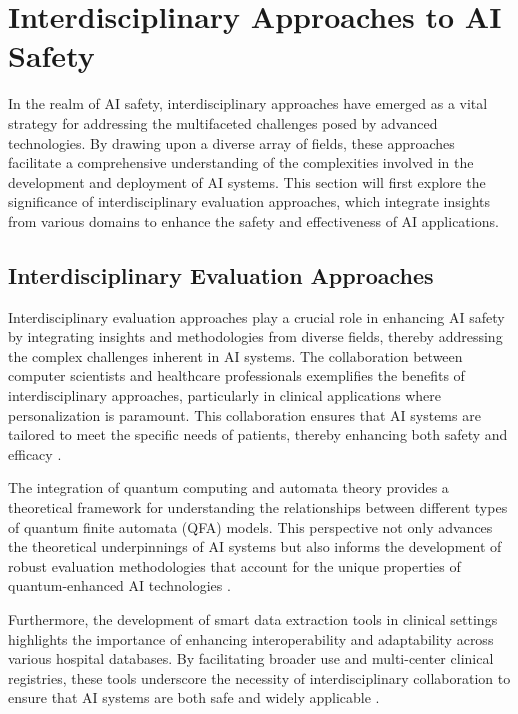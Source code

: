 \section{Interdisciplinary Approaches to AI Safety} \label{sec:Interdisciplinary Approaches to AI Safety}

In the realm of AI safety, interdisciplinary approaches have emerged as a vital strategy for addressing the multifaceted challenges posed by advanced technologies. By drawing upon a diverse array of fields, these approaches facilitate a comprehensive understanding of the complexities involved in the development and deployment of AI systems. This section will first explore the significance of interdisciplinary evaluation approaches, which integrate insights from various domains to enhance the safety and effectiveness of AI applications. 





\subsection{Interdisciplinary Evaluation Approaches} \label{subsec:Interdisciplinary Evaluation Approaches}

Interdisciplinary evaluation approaches play a crucial role in enhancing AI safety by integrating insights and methodologies from diverse fields, thereby addressing the complex challenges inherent in AI systems. The collaboration between computer scientists and healthcare professionals exemplifies the benefits of interdisciplinary approaches, particularly in clinical applications where personalization is paramount. This collaboration ensures that AI systems are tailored to meet the specific needs of patients, thereby enhancing both safety and efficacy \cite{kaur2024cropcontextwiserobuststatic}. 



The integration of quantum computing and automata theory provides a theoretical framework for understanding the relationships between different types of quantum finite automata (QFA) models. This perspective not only advances the theoretical underpinnings of AI systems but also informs the development of robust evaluation methodologies that account for the unique properties of quantum-enhanced AI technologies \cite{yakaryilmaz2010languagerecognitiongeneralizedquantum}. 



Furthermore, the development of smart data extraction tools in clinical settings highlights the importance of enhancing interoperability and adaptability across various hospital databases. By facilitating broader use and multi-center clinical registries, these tools underscore the necessity of interdisciplinary collaboration to ensure that AI systems are both safe and widely applicable \cite{quennelle2023smartdataextractorclinician}. 



